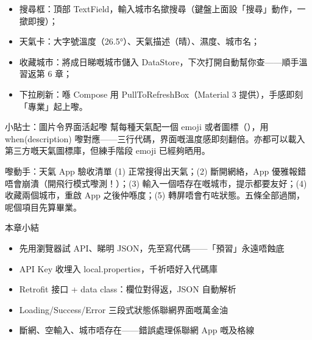 

\begin{itemize}
  \item 搜尋框：頂部 TextField，輸入城市名撳搜尋（鍵盤上面設「搜尋」動作，一撳即搜）；
  \item 天氣卡：大字號溫度（26.5°）、天氣描述（晴）、濕度、城市名；
  \item 收藏城市：將成日睇嘅城市儲入 DataStore，下次打開自動幫你查——順手溫習返第 6 章；
  \item 下拉刷新：喺 Compose 用 PullToRefreshBox（Material 3 提供），手感即刻「專業」起上嚟。
\end{itemize}

\begin{tcbinfo}{小貼士：圖片令界面活起嚟}
幫每種天氣配一個 emoji 或者圖標（），用 when(description) 嚟對應——三行代碼，界面嘅溫度感即刻翻倍。亦都可以載入第三方嘅天氣圖標庫，但練手階段 emoji 已經夠晒用。

\end{tcbinfo}

\begin{tcbpractice}{嚟動手：天氣 App 驗收清單}
(1) 正常搜得出天氣；(2) 斷開網絡，App 優雅報錯唔會崩潰（開飛行模式嚟測！）；(3) 輸入一個唔存在嘅城市，提示都要友好；(4) 收藏兩個城市，重啟 App 之後仲喺度；(5) 轉屏唔會冇咗狀態。五條全部過關，呢個項目先算畢業。

\end{tcbpractice}

\begin{tcbsummary}{本章小結}
\begin{itemize}
  \item 先用瀏覽器試 API、睇明 JSON，先至寫代碼——「預習」永遠唔蝕底
  \item API Key 收埋入 local.properties，千祈唔好入代碼庫
  \item Retrofit 接口 + data class：欄位對得返，JSON 自動解析
  \item Loading/Success/Error 三段式狀態係聯網界面嘅萬金油
  \item 斷網、空輸入、城市唔存在——錯誤處理係聯網 App 嘅及格線
\end{itemize}

\end{tcbsummary}
